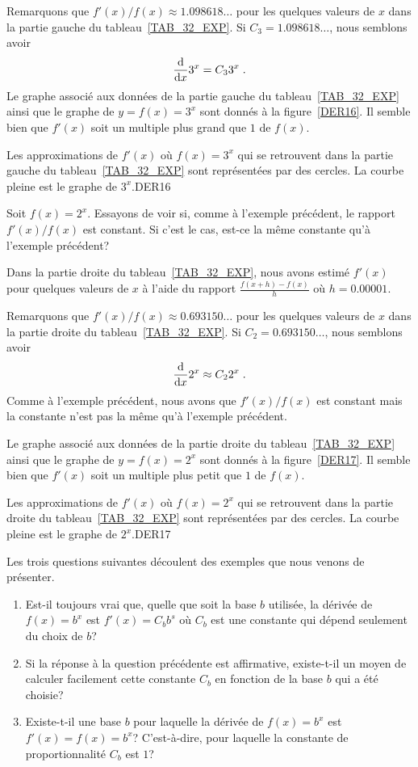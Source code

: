 {\begin{egg}
Remarquons que $f'(x) / f(x) \approx 1.098618\ldots$ pour les
quelques valeurs de $x$ dans la partie gauche du tableau~\ref{TAB_32_EXP}.  Si
$C_3 = 1.098618\ldots$, nous semblons avoir
\[
\dfdx{3^x}{x} = C_3 3^x \; .
\]
Le graphe associé aux données de la partie gauche du
tableau~\ref{TAB_32_EXP} ainsi que le graphe de $y=f(x)=3^x$ sont
donnés à la figure~\ref{DER16}.  Il semble bien que $f'(x)$ soit un
multiple plus grand que $1$ de $f(x)$.
\label{EGG_3_EXP}
\end{egg}

{Les approximations de $f'(x)$ où $f(x)=3^x$ qui se retrouvent dans la
partie gauche du tableau~\ref{TAB_32_EXP} sont représentées par des
cercles.  La courbe pleine est le graphe de $3^x$.}{DER16}

\begin{egg}
Soit $f(x) = 2^x$.  Essayons de voir si, comme à l'exemple précédent,
le rapport $f'(x)/f(x)$ est constant.  Si c'est le cas, est-ce la même
constante qu'à l'exemple précédent?

Dans la partie droite du tableau~\ref{TAB_32_EXP}, nous avons
estimé $f'(x)$ pour quelques valeurs de $x$ à l'aide du rapport
$\displaystyle \frac{f(x+h)-f(x)}{h}$ où $h = 0.00001$.

Remarquons que $f'(x)/f(x) \approx 0.693150\ldots$ pour les quelques
valeurs de $x$ dans la partie droite du tableau~\ref{TAB_32_EXP}.  Si
$C_2 = 0.693150\ldots$, nous semblons avoir
\[
\dfdx{2^x}{x} \approx C_2 2^x \; .
\]
Comme à l'exemple précédent, nous avons que $f'(x)/f(x)$ est constant mais
la constante n'est pas la même qu'à l'exemple précédent.

Le graphe associé aux données de la partie droite du
tableau~\ref{TAB_32_EXP} ainsi que le graphe de $y=f(x)=2^x$ sont
donnés à la figure~\ref{DER17}.  Il semble bien que $f'(x)$ soit un
multiple plus petit que $1$ de $f(x)$.
\label{EGG_2_EXP}
\end{egg}

{Les approximations de $f'(x)$ où $f(x)=2^x$ qui se retrouvent dans la
partie droite du tableau~\ref{TAB_32_EXP} sont représentées par des
cercles.  La courbe pleine est le graphe de $2^x$.}{DER17}

Les trois questions suivantes découlent des exemples que nous venons de
présenter.
\begin{enumerate}
\item Est-il toujours vrai que, quelle que soit la base $b$ utilisée,
la dérivée de $f(x) = b^x$ est $f'(x) = C_b b^s$ où $C_b$ est une
constante qui dépend seulement du choix de $b$?
\item Si la réponse à la question précédente est affirmative, existe-t-il un
moyen de calculer facilement cette constante $C_b$ en fonction de la base $b$
qui a été choisie?
\item Existe-t-il une base $b$ pour laquelle la dérivée de $f(x)=b^x$
est $f'(x) = f(x) = b^x$?  C'est-à-dire, pour laquelle la constante de
proportionnalité $C_b$ est $1$?
\end{enumerate}

}
